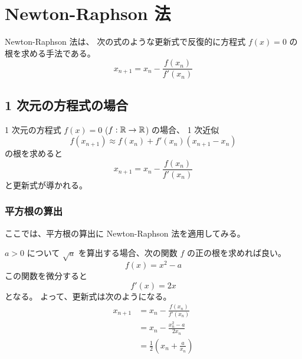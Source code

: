 %

\chapter{Newton-Raphson 法}

Newton-Raphson 法は、
次の式のような更新式で反復的に方程式 $f(x) = 0$ の根を求める手法である。
\begin{equation}
    x_{n+1} = x_n - \frac{f(x_n)}{f'(x_n)}
\end{equation}

\section{1 次元の方程式の場合}

1 次元の方程式 $f(x) = 0$ ($f: \mathbb{R} \to \mathbb{R}$) の場合、
1 次近似
\begin{equation}
    f(x_{n+1}) \approx f(x_n) + f'(x_n) (x_{n+1} - x_n)
\end{equation}
の根を求めると
\begin{equation}
    x_{n+1} = x_n - \frac{f(x_n)}{f'(x_n)}
    \label{eq:root-finding_newton-raphson_one-dim-update-law}
\end{equation}
と更新式が導かれる。

\subsection{平方根の算出}

ここでは、平方根の算出に Newton-Raphson 法を適用してみる。

$a>0$ について $\sqrt{a}$ を算出する場合、次の関数 $f$ の正の根を求めれば良い。
\begin{equation}
    f(x) = x^2 - a
\end{equation}
この関数を微分すると
\begin{equation}
    f'(x) = 2x
\end{equation}
となる。
よって、更新式は次のようになる。
\begin{align}
    x_{n+1} & = x_n - \frac{f(x_n)}{f'(x_n)}                \\
            & = x_n - \frac{x_n^2 - a}{2x_n}                \\
            & = \frac{1}{2}\left(x_n + \frac{a}{x_n}\right)
    \label{eq:root-finding_newton-raphson_sqrt-update-law}
\end{align}


